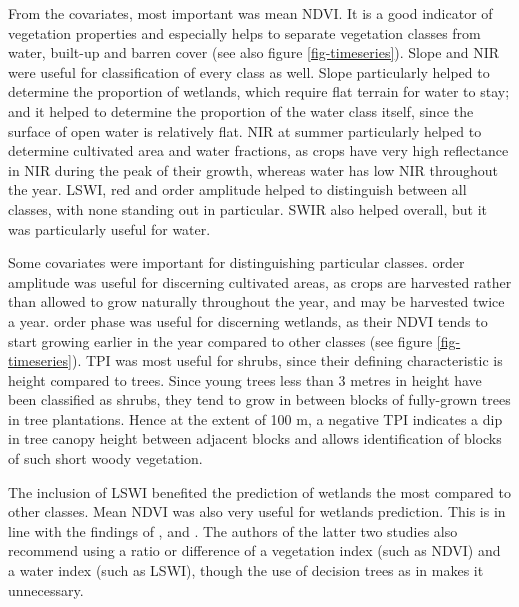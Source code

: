 \documentclass[a4paper,12pt]{scrbook}
\begin{document}
From the covariates, most important was mean NDVI. It is a good indicator of vegetation properties and especially helps to separate vegetation classes from water, built-up and barren cover (see also figure \ref{fig-timeseries}). Slope and NIR were useful for classification of every class as well. Slope particularly helped to determine the proportion of wetlands, which require flat terrain for water to stay; and it helped to determine the proportion of the water class itself, since the surface of open water is relatively flat. NIR at summer particularly helped to determine cultivated area and water fractions, as crops have very high reflectance in NIR during the peak of their growth, whereas water has low NIR throughout the year. LSWI, red and  order amplitude helped to distinguish between all classes, with none standing out in particular. SWIR also helped overall, but it was particularly useful for water.

Some covariates were important for distinguishing particular classes.  order amplitude was useful for discerning cultivated areas, as crops are harvested rather than allowed to grow naturally throughout the year, and may be harvested twice a year.  order phase was useful for discerning wetlands, as their NDVI tends to start growing earlier in the year compared to other classes (see figure \ref{fig-timeseries}). TPI was most useful for shrubs, since their defining characteristic is height compared to trees. Since young trees less than 3 metres in height have been classified as shrubs, they tend to grow in between blocks of fully-grown trees in tree plantations. Hence at the extent of 100 m, a negative TPI indicates a dip in tree canopy height between adjacent blocks and allows identification of blocks of such short woody vegetation.

The inclusion of LSWI benefited the prediction of wetlands the most compared to other classes. Mean NDVI was also very useful for wetlands prediction. This is in line with the findings of \citet{davranche2010wetland}, \citet{dong2014lswi} and \citet{zhao2009indices}. The authors of the latter two studies also recommend using a ratio or difference of a vegetation index (such as NDVI) and a water index (such as LSWI), though the use of decision trees as in \citet{davranche2010wetland} makes it unnecessary.
\end{document}
